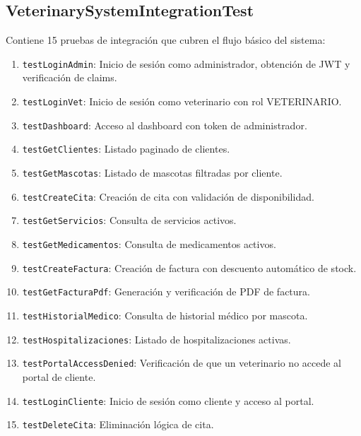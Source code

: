 \subsection{VeterinarySystemIntegrationTest}

Contiene 15 pruebas de integraci\'on que cubren el flujo b\'asico del sistema:

\begin{enumerate}
    \item \texttt{testLoginAdmin}: Inicio de sesi\'on como administrador, obtenci\'on de JWT y verificaci\'on de claims.
    \item \texttt{testLoginVet}: Inicio de sesi\'on como veterinario con rol VETERINARIO.
    \item \texttt{testDashboard}: Acceso al dashboard con token de administrador.
    \item \texttt{testGetClientes}: Listado paginado de clientes.
    \item \texttt{testGetMascotas}: Listado de mascotas filtradas por cliente.
    \item \texttt{testCreateCita}: Creaci\'on de cita con validaci\'on de disponibilidad.
    \item \texttt{testGetServicios}: Consulta de servicios activos.
    \item \texttt{testGetMedicamentos}: Consulta de medicamentos activos.
    \item \texttt{testCreateFactura}: Creaci\'on de factura con descuento autom\'atico de stock.
    \item \texttt{testGetFacturaPdf}: Generaci\'on y verificaci\'on de PDF de factura.
    \item \texttt{testHistorialMedico}: Consulta de historial m\'edico por mascota.
    \item \texttt{testHospitalizaciones}: Listado de hospitalizaciones activas.
    \item \texttt{testPortalAccessDenied}: Verificaci\'on de que un veterinario no accede al portal de cliente.
    \item \texttt{testLoginCliente}: Inicio de sesi\'on como cliente y acceso al portal.
    \item \texttt{testDeleteCita}: Eliminaci\'on l\'ogica de cita.
\end{enumerate}

